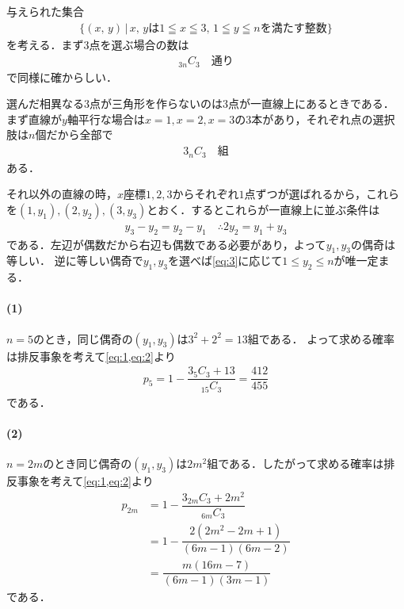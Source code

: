 \documentclass[../../main.tex]{subfiles}
\begin{document}
与えられた集合
\begin{align}
  \{ (x, \, y) \, | \, x, \, y \text{は}
  1\leqq x \leqq3, \, 1\leqq y \leqq n \text{を満たす整数} \}
\end{align}
を考える．まず$3$点を選ぶ場合の数は
\begin{align}
  {}_{3n}C_{3} \quad \text{通り} \label{eq:1}
\end{align}
で同様に確からしい．

選んだ相異なる3点が三角形を作らないのは$3$点が一直線上にあるときである．
まず直線が$y$軸平行な場合は$x=1,x=2,x=3$の$3$本があり，それぞれ点の選択肢は$n$個だから全部で
\begin{align}
  3{}_{n}C_{3} \quad \text{組} \label{eq:2}
\end{align}
ある．

それ以外の直線の時，$x$座標$1,2,3$からそれぞれ$1$点ずつが選ばれるから，これらを$(1,y_1),(2,y_2),(3,y_3)$とおく．するとこれらが一直線上に並ぶ条件は
\begin{align}
  y_3 - y_2 = y_2 - y_1
  \quad\therefore
  2y_2 = y_1 + y_3 \label{eq:3}
\end{align}
である．左辺が偶数だから右辺も偶数である必要があり，よって$y_1,y_3$の偶奇は等しい．
逆に等しい偶奇で$y_1,y_3$を選べば\cref{eq:3}に応じて$1 \le y_2 \le n$が唯一定まる．

\paragraph{(1)}

$n=5$のとき，同じ偶奇の$(y_1,y_3)$は$3^2+2^2=13$組である．
よって求める確率は排反事象を考えて\cref{eq:1,eq:2}より
\begin{align}
  p_5
  = 1-\dfrac{3{}_{5}C_{3}+13}{{}_{15}C_{3}}
  =\dfrac{412}{455}
\end{align}
である．

\paragraph{(2)}

$n=2m$のとき同じ偶奇の$(y_1,y_3)$は$2m^2$組である．したがって求める確率は排反事象を考えて\cref{eq:1,eq:2}より
\begin{align}
  p_{2m}
  &=1-\dfrac{3{}_{2m}C_{3}+2m^2}{{}_{6m}C_{3}}\\
  &=1-\dfrac{2(2m^2-2m+1)}{(6m-1)(6m-2)} \\
  &=\dfrac{m(16m-7)}{(6m-1)(3m-1)}
\end{align}
である．
\end{document}
